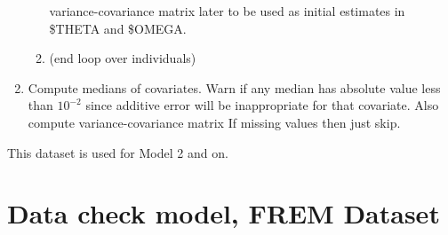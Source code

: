 \begin{enumerate}
\begin{enumerate}
variance-covariance matrix later to be used as initial estimates in \$THETA and \$OMEGA. 
\item[] (end loop over individuals)
\end{enumerate}

	\item Compute medians of %
    covariates. Warn if any median has absolute value less than $10^{-2}$ since additive error will be inappropriate for that covariate.
    Also compute variance-covariance matrix %
    If missing values then just skip.
\end{enumerate}

This dataset is used for Model 2 and on.

\section{Data check model, FREM Dataset}
